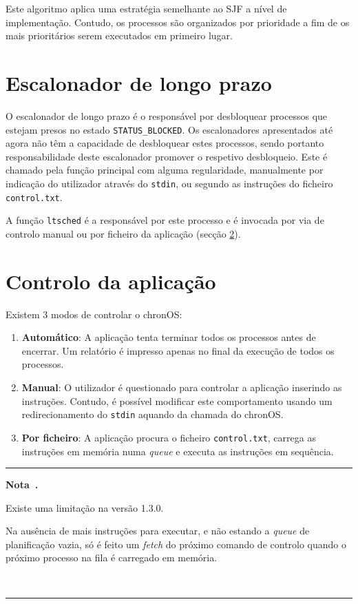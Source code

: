 \documentclass[10pt,oneside]{estiloUBI}
\newcommand{\chronOS}{\textsf{chronOS}}
\newcommand{\version}{1.3.0}
\newcounter{note}
\newenvironment{note}[1][]
	{
		\medskip \refstepcounter{note} \par \medskip
		\noindent\textcolor[RGB]{220,220,220}{\rule{\linewidth}{0.4pt}}
		\noindent \textbf{Nota~\thenote. #1} \rmfamily
	}
	{
		\\ \noindent\textcolor[RGB]{220,220,220}{\rule{\linewidth}{0.4pt}} \medskip
	}
\begin{document}
	Este algoritmo aplica uma estratégia semelhante ao \ac{SJF} a nível de implementação. Contudo, os processos são organizados por prioridade a fim de os mais prioritários serem executados em primeiro lugar.
	
	
	\section{Escalonador de longo prazo}
	\label{ssec:process:longterm}
	
	O escalonador de longo prazo é o responsável por desbloquear processos que estejam presos no estado \verb|STATUS_BLOCKED|. Os escalonadores apresentados até agora não têm a capacidade de desbloquear estes processos, sendo portanto responsabilidade deste escalonador promover o respetivo desbloqueio. Este é chamado pela função principal com alguma regularidade, manualmente por indicação do utilizador através do \verb|stdin|, ou segundo as instruções do ficheiro \verb|control.txt|.
	
	A função \verb|ltsched| é a responsável por este processo e é invocada por via de controlo manual ou por ficheiro da aplicação (secção \ref{ssec:process:control}).
	
	
	\section{Controlo da aplicação}
	\label{ssec:process:control}
	
	Existem 3 modos de controlar o \chronOS:
	
	\begin{enumerate}
		\item \textbf{Automático}: A aplicação tenta terminar todos os processos antes de encerrar. Um relatório é impresso apenas no final da execução de todos os processos.
		
		\item \textbf{Manual}: O utilizador é questionado para controlar a aplicação inserindo as instruções. Contudo, é possível modificar este comportamento usando um redirecionamento do \verb|stdin| aquando da chamada do \chronOS.
		
		\item \textbf{Por ficheiro}: A aplicação procura o ficheiro \verb|control.txt|, carrega as instruções em memória numa \textit{queue} e executa as instruções em sequência.
	\end{enumerate}

	
	\begin{note}
		Existe uma limitação na versão \version.
		
		Na ausência de mais instruções para executar, e não estando a \textit{queue} de planificação vazia, só é feito um \textit{fetch} do próximo comando de controlo quando o próximo processo na fila é carregado em memória.
	\end{note}
	
\end{document}
